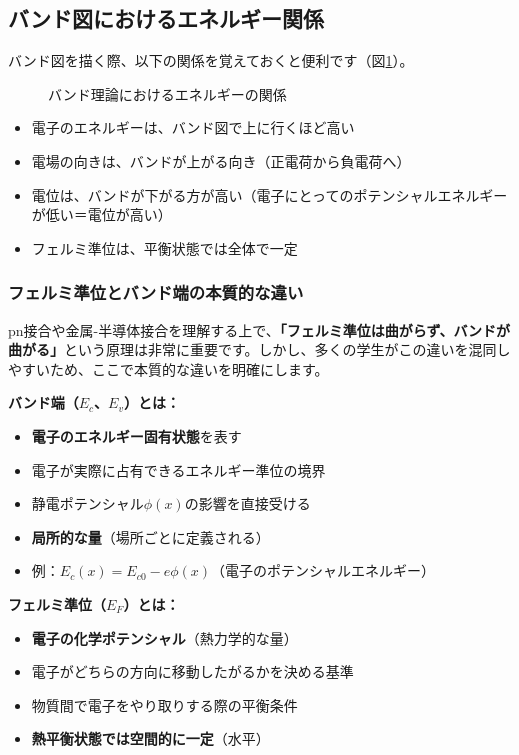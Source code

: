 \subsection{バンド図におけるエネルギー関係}

バンド図を描く際、以下の関係を覚えておくと便利です（図\ref{fig:band_energy}）。

\begin{figure}[H]
\centering
{}
\caption{バンド理論におけるエネルギーの関係}
\label{fig:band_energy}
\end{figure}

\begin{itemize}
\item 電子のエネルギーは、バンド図で上に行くほど高い
\item 電場の向きは、バンドが上がる向き（正電荷から負電荷へ）
\item 電位は、バンドが下がる方が高い（電子にとってのポテンシャルエネルギーが低い＝電位が高い）
\item フェルミ準位は、平衡状態では全体で一定
\end{itemize}

\subsubsection{フェルミ準位とバンド端の本質的な違い}

pn接合や金属-半導体接合を理解する上で、\textbf{「フェルミ準位は曲がらず、バンドが曲がる」}という原理は非常に重要です。しかし、多くの学生がこの違いを混同しやすいため、ここで本質的な違いを明確にします。

\textbf{バンド端（$E_c$、$E_v$）とは：}

\begin{itemize}
\item \textbf{電子のエネルギー固有状態}を表す
\item 電子が実際に占有できるエネルギー準位の境界
\item 静電ポテンシャル$\phi(x)$の影響を直接受ける
\item \textbf{局所的な量}（場所ごとに定義される）
\item 例：$E_c(x) = E_{c0} - e\phi(x)$（電子のポテンシャルエネルギー）
\end{itemize}

\textbf{フェルミ準位（$E_F$）とは：}

\begin{itemize}
\item \textbf{電子の化学ポテンシャル}（熱力学的な量）
\item 電子がどちらの方向に移動したがるかを決める基準
\item 物質間で電子をやり取りする際の平衡条件
\item \textbf{熱平衡状態では空間的に一定}（水平）
\end{itemize}

